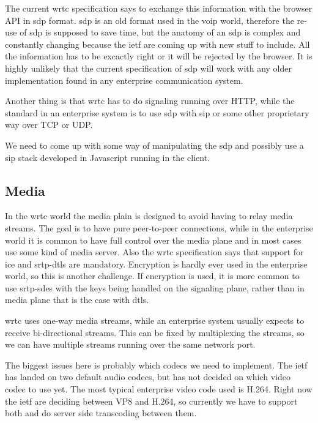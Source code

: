 The current \gls{wrtc} specification says to exchange this information with the browser API in \gls{sdp} format. \gls{sdp} is an old format used in the \gls{voip} world, therefore the re-use of \gls{sdp} is supposed to save time, but the anatomy of an \gls{sdp} is complex and constantly changing because the \gls{ietf} are coming up with new stuff to include. All the information has to be excactly right or it will be rejected by the browser. It is highly unlikely that the current specification of \gls{sdp} will work with any older implementation found in any enterprise communication system.

Another thing is that \gls{wrtc} has to do signaling running over HTTP, while the standard in an enterprise system is to use \gls{sdp} with \gls{sip} or some other proprietary way over TCP or UDP.

We need to come up with some way of manipulating the \gls{sdp} and possibly use a \gls{sip} stack developed in Javascript running in the client.

\subsection{Media}
In the \gls{wrtc} world the media plain is designed to avoid having to relay media streams. The goal is to have pure peer-to-peer connections, while in the enterprise world it is common to have full control over the media plane and in most cases use some kind of media server. Also the \gls{wrtc} specification says that support for \gls{ice} and \gls{srtp}-\gls{dtls} are mandatory. Encryption is hardly ever used in the enterprise world, so this is another challenge. If encryption is used, it is more common to use \gls{srtp}-\gls{sdes} with the keys being handled on the signaling plane, rather than in media plane that is the case with \gls{dtls}.

\gls{wrtc} uses one-way media streams, while an enterprise system usually expects to receive bi-directional streams. This can be fixed by multiplexing the streams, so we can have multiple streams running over the same network port.

The biggest issues here is probably which codecs we need to implement. The \gls{ietf} has landed on two default audio codecs, but has not decided on which video codec to use yet. The most typical enterprise video code used is H.264. Right now the \gls{ietf} are deciding between VP8 and H.264, so currently we have to support both and do server side transcoding between them.

